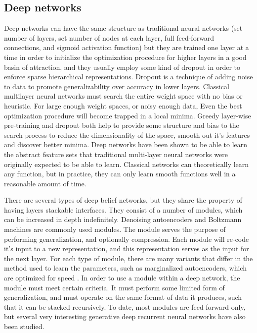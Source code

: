 \documentclass[12pt]{article}
\begin{document}
\begin{doublespacing}
	\subsection{Deep networks}
Deep networks can have the same structure as traditional neural networks (set number of layers, set number of nodes at each layer, full feed-forward connections, and sigmoid activation function) but they are trained one layer at a time in order to initialize the optimization procedure for higher layers in a good basin of attraction, and they usually employ some kind of dropout in order to enforce sparse hierarchical representations\cite{hinton2012improving, krizhevsky2012imagenet}. Dropout is a technique of adding noise to data to promote generalizability over accuracy in lower layers. Classical multilayer neural networks must search the entire weight space with no bias or heuristic. For large enough weight spaces, or noisy enough data, Even the best optimization procedure will become trapped in a local minima. Greedy layer-wise pre-training and dropout both help to provide some structure and bias to the search process to reduce the dimensionality of the space, smooth out it's features and discover better minima.  Deep networks have been shown to be able to learn the abstract feature sets that traditional multi-layer neural networks were originally expected to be able to learn\cite{hinton2012deep}. Classical networks can theoretically learn any function, but in practice, they can only learn smooth functions well in a reasonable amount of time. 

There are several types of deep belief networks, but they share the property of having layers stackable interfaces. They consist of a number of modules, which can be increased in depth indefinitely. Denoising autoencoders and Boltzmann machines are commonly used modules\cite{salakhutdinov2007restricted}. The module serves the purpose of performing generalization, and optionally compression. Each module will re-code it's input to a new representation, and this representation serves as the input for the next layer. For each type of module, there are many variants that differ in the method used to learn the parameters, such as marginalized autoencoders, which are optimized for speed \cite{chen2012marginalized}. In order to use a module within a deep network, the module must meet certain criteria. It must perform some limited form of generalization, and must operate on the same format of data it produces, such that it can be stacked recursively. To date, most modules are feed forward only, but several very interesting generative deep recurrent neural networks have also been studied\cite{graves2013generating}.


\end{doublespacing}
\end{document}
